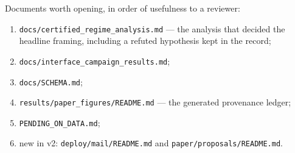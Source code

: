 \documentclass[11pt,a4paper]{article}
\newcommand{\code}[1]{\texttt{#1}}
\begin{document}
Documents worth opening, in order of usefulness to a reviewer:
\begin{enumerate}[leftmargin=1.6em,itemsep=1pt]
\item \code{docs/certified\_regime\_analysis.md} --- the analysis that decided the
  headline framing, including a refuted hypothesis kept in the record;
\item \code{docs/interface\_campaign\_results.md};
\item \code{docs/SCHEMA.md};
\item \code{results/paper\_figures/README.md} --- the generated provenance ledger;
\item \code{PENDING\_ON\_DATA.md};
\item new in v2: \code{deploy/mail/README.md} and
  \code{paper/proposals/README.md}.
\end{enumerate}
\end{document}
